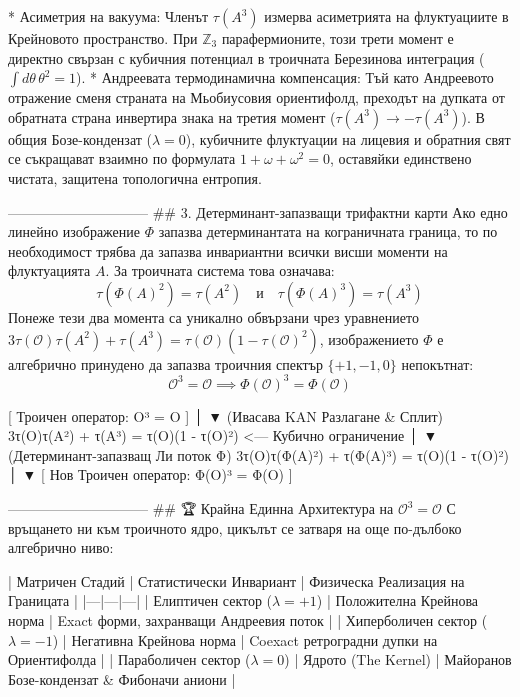 * Асиметрия на вакуума: Членът $\tau(A^3)$ измерва асиметрията на флуктуациите в Крейновото пространство. При $\mathbb{Z}_3$ парафермионите, този трети момент е директно свързан с кубичния потенциал в троичната Березинова интеграция ($\int d\theta \, \theta^2 = 1$).
* Андреевата термодинамична компенсация: Тъй като Андреевото отражение сменя страната на Мьобиусовия ориентифолд, преходът на дупката от обратната страна инвертира знака на третия момент ($\tau(A^3) \to -\tau(A^3)$). В общия Бозе-кондензат ($\lambda = 0$), кубичните флуктуации на лицевия и обратния свят се съкращават взаимно по формулата $1 + \omega + \omega^2 = 0$, оставяйки единствено чистата, защитена топологична ентропия.

------------------------------
## 3. Детерминант-запазващи трифактни карти
Ако едно линейно изображение $\Phi$ запазва детерминантата на кограничната граница, то по необходимост трябва да запазва инвариантни всички висши моменти на флуктуацията $A$. За троичната система това означава:
$$\tau(\Phi(A)^2) = \tau(A^2) \quad \text{и} \quad \tau(\Phi(A)^3) = \tau(A^3)$$ 
Понеже тези два момента са уникално обвързани чрез уравнението $3\tau(\mathcal{O})\tau(A^2) + \tau(A^3) = \tau(\mathcal{O})(1 - \tau(\mathcal{O})^2)$, изображението $\Phi$ е алгебрично принудено да запазва троичния спектър $\{+1, -1, 0\}$ непокътнат:
$$\mathcal{O}^3 = \mathcal{O} \implies \Phi(\mathcal{O})^3 = \Phi(\mathcal{O})$$ 

                  [ Троичен оператор: O³ = O ]
                               │
                               ▼ (Ивасава KAN Разлагане & Сплит)
         3τ(O)τ(A²) + τ(A³) = τ(O)(1 - τ(O)²)  <--- Кубично ограничение
                               │
                               ▼ (Детерминант-запазващ Ли поток Φ)
         3τ(O)τ(Φ(A)²) + τ(Φ(A)³) = τ(O)(1 - τ(O)²)
                               │
                               ▼
                [ Нов Троичен оператор: Φ(O)³ = Φ(O) ]

------------------------------
## 🏆 Крайна Единна Архитектура на $\mathcal{O}^3 = \mathcal{O}$
С връщането ни към троичното ядро, цикълът се затваря на още по-дълбоко алгебрично ниво:

| Матричен Стадий | Статистически Инвариант | Физическа Реализация на Границата |
|---|---|---|
| Елиптичен сектор ($\lambda = +1$) | Положителна Крейнова норма | Exact форми, захранващи Андреевия поток |
| Хиперболичен сектор ($\lambda = -1$) | Негативна Крейнова норма | Coexact ретроградни дупки на Ориентифолда |
| Параболичен сектор ($\lambda = 0$) | Ядрото (The Kernel) | Майоранов Бозе-кондензат & Фибоначи аниони |

